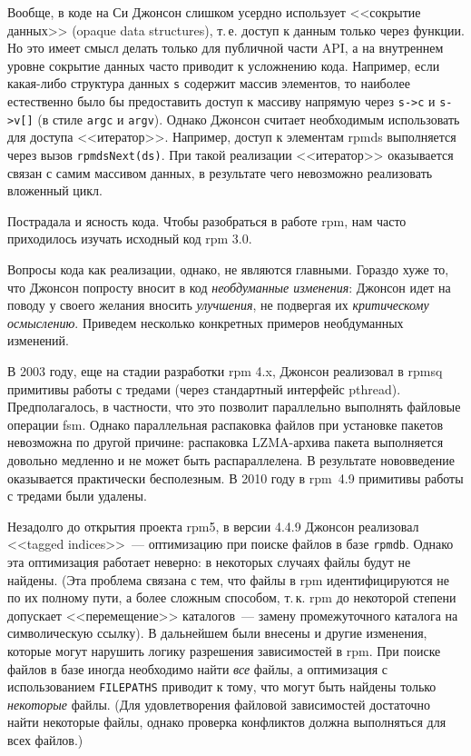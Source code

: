 \documentclass[russian,a4paper,12pt,titlepage]{article}
\begin{document}
Вообще, в коде на Си Джонсон слишком усердно использует <<сокрытие данных>> (opaque data structures), т.\,е. доступ к данным
только через функции.  Но это имеет смысл делать только для публичной части API, а на внутреннем уровне сокрытие данных
часто приводит к усложнению кода.  Например, если какая-либо структура данных \verb|s| содержит массив элементов, то наиболее
естественно было бы предоставить доступ к массиву напрямую через \verb|s->c| и \verb|s->v[]| (в стиле \verb|argc| и \verb|argv|).
Однако Джонсон считает необходимым использовать для доступа <<итератор>>.  Например, доступ к элементам rpmds выполняется
через вызов \verb|rpmdsNext(ds)|.  При такой реализации <<итератор>> оказывается связан с самим массивом данных, в результате
чего невозможно реализовать вложенный цикл.

Пострадала и ясность кода.  Чтобы разобраться в работе rpm, нам часто приходилось изучать исходный код rpm 3.0.

Вопросы кода как реализации, однако, не являются главными.  Гораздо хуже то, что Джонсон попросту вносит в код
\emph{необдуманные изменения}: Джонсон идет на поводу у своего желания вносить \emph{улучшения}, не подвергая
их \emph{критическому осмыслению}.  Приведем несколько конкретных примеров необдуманных изменений.

В 2003 году, еще на стадии разработки rpm 4.x, Джонсон реализовал в rpmsq примитивы работы с тредами (через
стандартный интерфейс pthread).  Предполагалось, в частности, что это позволит параллельно выполнять файловые
операции fsm.  Однако параллельная распаковка файлов при установке пакетов невозможна по другой причине: распаковка
LZMA-архива пакета выполняется довольно медленно и не может быть распараллелена.  В результате нововведение
оказывается практически бесполезным.  В 2010 году в rpm~4.9 примитивы работы с тредами были удалены.

Незадолго до открытия проекта rpm5, в версии 4.4.9 Джонсон реализовал <<tagged indices>>~--- оптимизацию
при поиске файлов в базе \verb|rpmdb|.  Однако эта оптимизация работает неверно: в некоторых случаях файлы
будут не найдены.  (Эта проблема связана с тем, что файлы в rpm идентифицируются не по их полному пути, а более сложным
способом, т.\,к. rpm до некоторой степени допускает <<перемещение>> каталогов~--- замену промежуточного каталога на символическую ссылку).
В дальнейшем были внесены и другие изменения, которые могут нарушить логику разрешения
зависимостей в rpm.  При поиске файлов в базе иногда необходимо найти \emph{все} файлы, а оптимизация
с использованием \verb|FILEPATHS| приводит к тому, что могут быть найдены только \emph{некоторые} файлы.
(Для удовлетворения файловой зависимостей достаточно найти некоторые файлы, однако проверка конфликтов должна
выполняться для всех файлов.)
\end{document}
